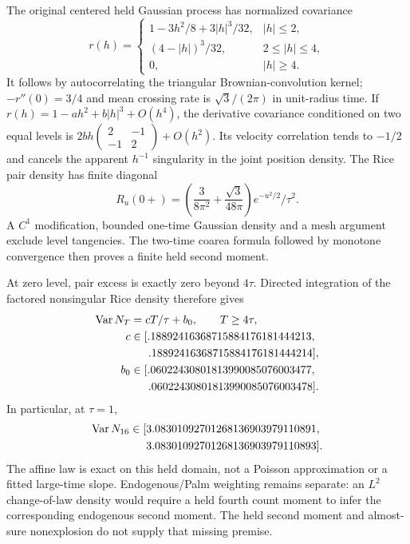 The original centered held Gaussian process has normalized covariance
\begin{equation}
 r(h)=\begin{cases}
 1-3h^2/8+3|h|^3/32,&|h|\le2,\\
 (4-|h|)^3/32,&2\le|h|\le4,\\
 0,&|h|\ge4.
 \end{cases}
\end{equation}
It follows by autocorrelating the triangular Brownian-convolution kernel;
$-r''(0)=3/4$ and mean crossing rate is $\sqrt3/(2\pi)$ in unit-radius
time. If $r(h)=1-ah^2+b|h|^3+O(h^4)$, the derivative covariance conditioned
on two equal levels is
$2bh\left(\begin{smallmatrix}2&-1\\-1&2\end{smallmatrix}\right)+O(h^2)$.
Its velocity correlation tends to $-1/2$ and cancels the apparent
$h^{-1}$ singularity in the joint position density. The Rice pair density
has finite diagonal
\begin{equation}
 R_u(0+)=\left(\frac3{8\pi^2}+\frac{\sqrt3}{48\pi}\right)
                    e^{-u^2/2}/\tau^2.
\end{equation}
A $C^1$ modification, bounded one-time Gaussian density and a mesh
argument exclude level tangencies. The two-time coarea formula followed
by monotone convergence then proves a finite held second moment.

At zero level, pair excess is exactly zero beyond $4\tau$. Directed
integration of the factored nonsingular Rice density therefore gives
\begin{align}
 \operatorname{Var} N_T&=cT/\tau+b_0,\qquad T\ge4\tau,\\
 c&\in[.18892416368715884176181444213,\notag\\
     &\hspace{1.6em}.18892416368715884176181444214],\notag\\
 b_0&\in[.06022430801813990085076003477,\notag\\
     &\hspace{1.6em}.06022430801813990085076003478].\notag
\end{align}
In particular, at $\tau=1$,
\begin{equation}
\begin{split}
 \operatorname{Var} N_{16}\in[&3.08301092701268136903979110891,\\
               &3.08301092701268136903979110893].
\end{split}
\end{equation}
The affine law is exact on this held domain, not a Poisson approximation
or a fitted large-time slope. Endogenous/Palm weighting remains separate:
an $L^2$ change-of-law density would require a held fourth count moment
to infer the corresponding endogenous second moment. The held second
moment and almost-sure nonexplosion do not supply that missing premise.

